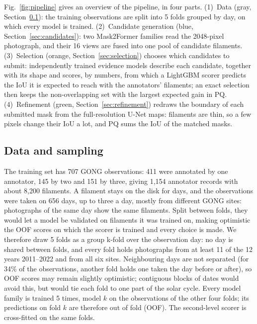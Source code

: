 \documentclass[sigconf]{acmart}
\begin{document}
Fig.~\ref{fig:pipeline} gives an overview of the pipeline, in four parts. (1)~Data (gray, Section~\ref{sec:data}): the training observations are split into 5 folds grouped by day, on which every model is trained. (2)~Candidate generation (blue, Section~\ref{sec:candidates}): two Mask2Former families read the 2048-pixel photograph, and their 16 views are fused into one pool of candidate filaments. (3)~Selection (orange, Section~\ref{sec:selection}) chooses which candidates to submit: independently trained evidence models describe each candidate, together with its shape and scores, by  numbers, from which a LightGBM scorer predicts the IoU it is expected to reach with the annotators' filaments; an exact selection then keeps the non-overlapping set with the largest expected gain in PQ. (4)~Refinement (green, Section~\ref{sec:refinement}) redraws the boundary of each submitted mask from the full-resolution U-Net maps: filaments are thin, so a few pixels change their IoU a lot, and PQ sums the IoU of the matched masks.

\subsection{Data and sampling}\label{sec:data}
The training set has 707 GONG \cite{harvey1996gong} observations: 411 were annotated by one annotator, 145 by two and 151 by three, giving 1,154 annotator records with about 8,200 filaments. A filament stays on the disk for days, and the observations were taken on 656 days, up to three a day, mostly from different GONG sites: photographs of the same day show the same filaments. Split between folds, they would let a model be validated on filaments it was trained on, making optimistic the OOF scores on which the scorer is trained and every choice is made. We therefore draw 5 folds as a group k-fold over the observation day: no day is shared between folds, and every fold holds photographs from at least 11 of the 12 years 2011--2022 and from all six sites. Neighbouring days are not separated (for 34\% of the observations, another fold holds one taken the day before or after), so OOF scores may remain slightly optimistic; contiguous blocks of dates would avoid this, but would tie each fold to one part of the solar cycle. Every model family is trained 5 times, model $k$ on the observations of the other four folds; its predictions on fold $k$ are therefore out of fold (OOF). The second-level scorer is cross-fitted on the same folds.
\end{document}
